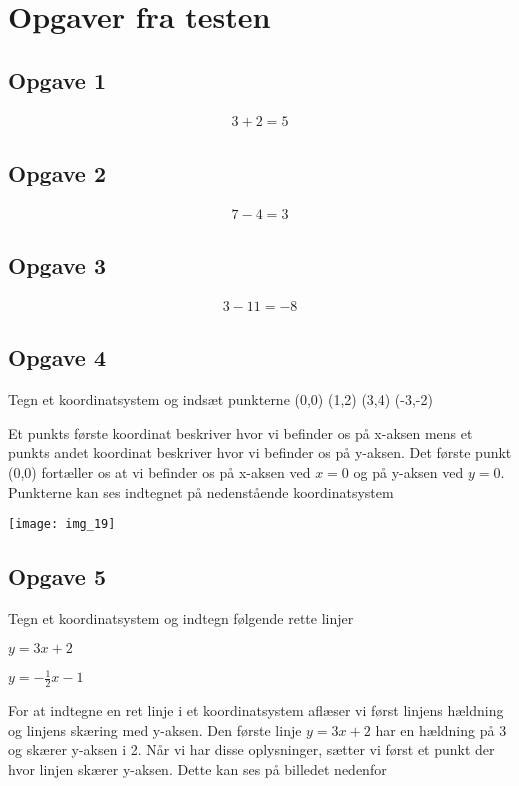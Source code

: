 \section{Opgaver fra testen}

\subsection{Opgave 1}
\begin{align*}
3+2 = 5
\end{align*}

\subsection{Opgave 2}
\begin{align*}
7-4 = 3
\end{align*}

\subsection{Opgave 3}
\begin{align*}
3-11 = -8
\end{align*}

\subsection{Opgave 4}
Tegn et koordinatsystem og indsæt punkterne (0,0) (1,2) (3,4) (-3,-2)

Et punkts første koordinat beskriver hvor vi befinder os på x-aksen mens et punkts andet koordinat beskriver hvor vi befinder os på y-aksen. Det første punkt (0,0) fortæller os at vi befinder os på x-aksen ved $x = 0$ og på y-aksen ved $y = 0$. Punkterne kan ses indtegnet på nedenstående koordinatsystem

\texttt{[image: img\_19]}



\subsection{Opgave 5}
Tegn et koordinatsystem og indtegn følgende rette linjer

$y = 3x+2$

$y = -\frac{1}{2}x-1$

For at indtegne en ret linje i et koordinatsystem aflæser vi først linjens hældning og linjens skæring med y-aksen. 
Den første linje $y = 3x+2$ har en hældning på 3 og skærer y-aksen i 2. Når vi har disse oplysninger, sætter vi først et punkt der hvor linjen skærer y-aksen. Dette kan ses på billedet nedenfor

